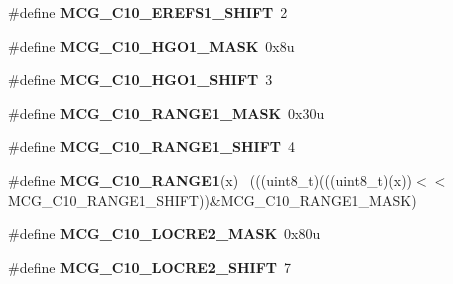 \begin{DoxyCompactItemize}
\item 
\hypertarget{group___m_c_g___register___masks_ga809020801444b5693361ba7ee976d3bf}{}\#define {\bfseries M\+C\+G\+\_\+\+C10\+\_\+\+E\+R\+E\+F\+S1\+\_\+\+S\+H\+I\+F\+T}~2\label{group___m_c_g___register___masks_ga809020801444b5693361ba7ee976d3bf}

\item 
\hypertarget{group___m_c_g___register___masks_ga5d51e2368859014f82febb7ee46db95b}{}\#define {\bfseries M\+C\+G\+\_\+\+C10\+\_\+\+H\+G\+O1\+\_\+\+M\+A\+S\+K}~0x8u\label{group___m_c_g___register___masks_ga5d51e2368859014f82febb7ee46db95b}

\item 
\hypertarget{group___m_c_g___register___masks_gafe08c983deee7fbe474b8ec892ce3bd9}{}\#define {\bfseries M\+C\+G\+\_\+\+C10\+\_\+\+H\+G\+O1\+\_\+\+S\+H\+I\+F\+T}~3\label{group___m_c_g___register___masks_gafe08c983deee7fbe474b8ec892ce3bd9}

\item 
\hypertarget{group___m_c_g___register___masks_ga13646f684d69cdb1d1140346fa25f6f4}{}\#define {\bfseries M\+C\+G\+\_\+\+C10\+\_\+\+R\+A\+N\+G\+E1\+\_\+\+M\+A\+S\+K}~0x30u\label{group___m_c_g___register___masks_ga13646f684d69cdb1d1140346fa25f6f4}

\item 
\hypertarget{group___m_c_g___register___masks_ga022692bd58d3d8022cfdcf5099a6726c}{}\#define {\bfseries M\+C\+G\+\_\+\+C10\+\_\+\+R\+A\+N\+G\+E1\+\_\+\+S\+H\+I\+F\+T}~4\label{group___m_c_g___register___masks_ga022692bd58d3d8022cfdcf5099a6726c}

\item 
\hypertarget{group___m_c_g___register___masks_ga3079d0bda9efaad3c6f1c304255448e1}{}\#define {\bfseries M\+C\+G\+\_\+\+C10\+\_\+\+R\+A\+N\+G\+E1}(x)                                            ~(((uint8\+\_\+t)(((uint8\+\_\+t)(x))$<$$<$M\+C\+G\+\_\+\+C10\+\_\+\+R\+A\+N\+G\+E1\+\_\+\+S\+H\+I\+F\+T))\&M\+C\+G\+\_\+\+C10\+\_\+\+R\+A\+N\+G\+E1\+\_\+\+M\+A\+S\+K)\label{group___m_c_g___register___masks_ga3079d0bda9efaad3c6f1c304255448e1}

\item 
\hypertarget{group___m_c_g___register___masks_ga5a01b4523fcc029e26cfc67343aa61eb}{}\#define {\bfseries M\+C\+G\+\_\+\+C10\+\_\+\+L\+O\+C\+R\+E2\+\_\+\+M\+A\+S\+K}~0x80u\label{group___m_c_g___register___masks_ga5a01b4523fcc029e26cfc67343aa61eb}

\item 
\hypertarget{group___m_c_g___register___masks_ga7e479c66d0cd13cee40b9fbf49f7bc7c}{}\#define {\bfseries M\+C\+G\+\_\+\+C10\+\_\+\+L\+O\+C\+R\+E2\+\_\+\+S\+H\+I\+F\+T}~7\label{group___m_c_g___register___masks_ga7e479c66d0cd13cee40b9fbf49f7bc7c}


\end{DoxyCompactItemize}
